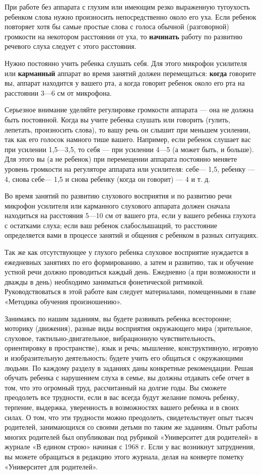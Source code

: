\documentclass{book}
\begin{document}
При работе без аппарата с глухим или имеющим резко выраженную тугоухость
ребенком слова нужно произносить непосредственно около его уха. Если
ребенок повторяет хотя бы самые простые слова с голоса обычной
(разговорной) громкости на некотором расстоянии от уха, то
\textbf{начинать} работу по развитию речевого слуха следует с этого
расстояния.

Нужно постоянно учить ребенка слушать себя. Для этого микрофон усилителя
или \textbf{карманный} аппарат во время занятий должен перемещаться:
\textbf{когда} говорите вы, аппарат находится у вашего рта, а когда
говорит ребенок около его рта на расстоянии 3---6 см от микрофона.

Серьезное внимание уделяйте регулировке громкости аппарата --- она не
должна быть постоянной. Когда вы учите ребенка слушать или говорить
(гулить, лепетать, произносить слова), то вашу речь он слышит при
меньшем усилении, так как его голосок намного тише вашего. Например,
если ребенок слушает вас при усилении 1,5---3,5, то себя --- при
усилении 4---5 (а может быть, и больше). Для этого вы (а не ребенок) при
перемещении аппарата постоянно меняете уровень громкости на регуляторе
аппарата или усилителя: себе--- 1,5, ребенку --- 4, снова себе--- 1,5 и
снова ребенку (когда он говорит) --- 4 и т. д.

Во время занятий по развитию слухового восприятия и по развитию речи
микрофон усилителя или карманного слухового аппарата должен сначала
находиться на расстояния 5---10 см от вашего рта, если у вашего ребенка
глухота с остатками слуха; если ваш ребенок слабослышащий, то расстояние
определяется вами в процессе занятий и общения с ребенком в разных
ситуациях.

Так же как отсутствующее у глухого ребенка слуховое восприятие нуждается
в ежедневных занятиях по его формированию, а затем и развитию, так и
обучение устной речи должно проводиться каждый день. Ежедневно (а при
возможности и дважды в день) необходимо заниматься фонетической
ритмикой. Руководствоваться в этой работе вам следует материалами,
помещенными в главе «Методика обучения произношению».

Занимаясь по нашим заданиям, вы будете развивать ребенка всесторонне;
моторику (движения), разные виды восприятия окружающего мира
(зрительное, слуховое, тактильно-двигательное, вибрационную
чувствительность, ориентировку в пространстве), язык и речь; мышление,
конструктивную, игровую и изобразительную деятельность; будете учить его
общаться с окружающими людьми. По каждому разделу в заданиях даны
конкретные рекомендации. Решая обучать ребенка с нарушением слуха в
семье, вы должны отдавать себе отчет в том, что это огромный труд,
рассчитанный на долгие годы. Вы сможете преодолеть все трудности, если в
вас всегда будут желание помочь ребенку, терпение, выдержка, уверенность
в возможностях вашего ребенка и в своих силах. О том, что эти трудности
можно преодолеть, свидетельствует опыт тысяч родителей, занимающихся со
своими детьми по таким же заданиям. Опыт работы многих родителей был
опубликован под рубрикой «Университет для родителей» в журнале «В едином
строю» начиная с 1968 г. Если у вас возникнут затруднения, вы можете
обращаться в редакцию этого журнала, делая на конверте пометку
«Университет для родителей».
\end{document}
